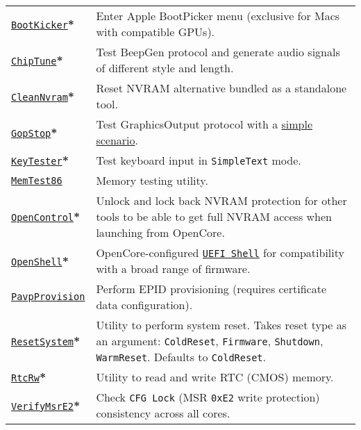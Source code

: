\documentclass[]{article}
\begin{document}
\begin{tabular}{p{1.3in}p{5.55in}}
\href{https://github.com/acidanthera/OpenCorePkg}{\texttt{BootKicker}}\textbf{*}
& Enter Apple BootPicker menu (exclusive for Macs with compatible GPUs). \\
\href{https://github.com/acidanthera/OpenCorePkg}{\texttt{ChipTune}}\textbf{*}
& Test BeepGen protocol and generate audio signals of different style and length. \\
\href{https://github.com/acidanthera/OpenCorePkg}{\texttt{CleanNvram}}\textbf{*}
& Reset NVRAM alternative bundled as a standalone tool. \\
\href{https://github.com/acidanthera/OpenCorePkg}{\texttt{GopStop}}\textbf{*}
& Test GraphicsOutput protocol with a
  \href{https://github.com/acidanthera/OpenCorePkg/tree/master/Application/GopStop}{simple scenario}. \\
\href{https://github.com/acidanthera/OpenCorePkg}{\texttt{KeyTester}}\textbf{*}
& Test keyboard input in \texttt{SimpleText} mode. \\
\href{https://www.memtest86.com}{\texttt{MemTest86}}
& Memory testing utility. \\
\href{https://github.com/acidanthera/OpenCorePkg}{\texttt{OpenControl}}\textbf{*}
& Unlock and lock back NVRAM protection for other tools to be able to get full NVRAM access
  when launching from OpenCore. \\
\href{https://github.com/acidanthera/OpenCorePkg}{\texttt{OpenShell}}\textbf{*}
& OpenCore-configured \href{http://github.com/tianocore/edk2}{\texttt{UEFI Shell}} for compatibility
  with a broad range of firmware. \\
\href{https://github.com/acidanthera/OpenCorePkg}{\texttt{PavpProvision}}
& Perform EPID provisioning (requires certificate data configuration). \\
\href{https://github.com/acidanthera/OpenCorePkg}{\texttt{ResetSystem}}\textbf{*}
& Utility to perform system reset. Takes reset type as an argument:
  \texttt{ColdReset}, \texttt{Firmware}, \texttt{Shutdown}, \texttt{WarmReset}.
  Defaults to \texttt{ColdReset}. \\
\href{https://github.com/acidanthera/OpenCorePkg}{\texttt{RtcRw}}\textbf{*}
& Utility to read and write RTC (CMOS) memory. \\
\href{https://github.com/acidanthera/OpenCorePkg}{\texttt{VerifyMsrE2}}\textbf{*}
& Check \texttt{CFG Lock} (MSR \texttt{0xE2} write protection) consistency across all cores.
\end{tabular}
\end{document}
